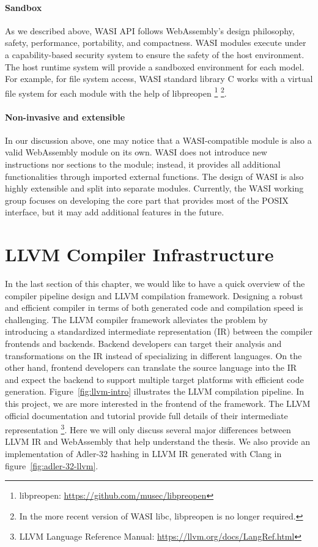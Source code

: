 \paragraph{Sandbox}
As we described above, WASI API follows WebAssembly's design philosophy, safety,
performance, portability, and compactness. WASI modules execute under a
capability-based security system to ensure the safety of the host environment.
The host runtime system will provide a sandboxed environment for each model. For
example, for file system access, WASI standard library C works with a virtual
file system for each module with the help of libpreopen \footnote{libpreopen:
  \url{https://github.com/musec/libpreopen}} \footnote{In the more recent
  version of WASI libc, libpreopen is no longer required.}.

\paragraph{Non-invasive and extensible}
In our discussion above, one may notice that a WASI-compatible module is also a
valid WebAssembly module on its own. WASI does not introduce new instructions
nor sections to the module; instead, it provides all additional functionalities
through imported external functions. The design of WASI is also highly
extensible and split into separate modules. Currently, the WASI working group
focuses on developing the core part that provides most of the POSIX interface,
but it may add additional features in the future.

\section{LLVM Compiler Infrastructure}

In the last section of this chapter, we would like to have a quick overview of
the compiler pipeline design and LLVM compilation framework. Designing a robust
and efficient compiler in terms of both generated code and compilation speed is
challenging. The LLVM compiler framework \cite{llvm-thesis} alleviates the
problem by introducing a standardized intermediate representation (IR) between
the compiler frontends and backends. Backend developers can target their
analysis and transformations on the IR instead of specializing in different
languages. On the other hand, frontend developers can translate the source
language into the IR and expect the backend to support multiple target platforms
with efficient code generation. Figure~\ref{fig:llvm-intro} illustrates the LLVM
compilation pipeline. In this project, we are more interested in the frontend of
the framework. The LLVM official documentation and tutorial provide full details
of their intermediate representation \footnote{LLVM Language Reference Manual:
  \url{https://llvm.org/docs/LangRef.html}}. Here we will only discuss several
major differences between LLVM IR and WebAssembly that help understand the
thesis. We also provide an implementation of Adler-32 hashing in LLVM IR
generated with Clang in figure~\ref{fig:adler-32-llvm}.

